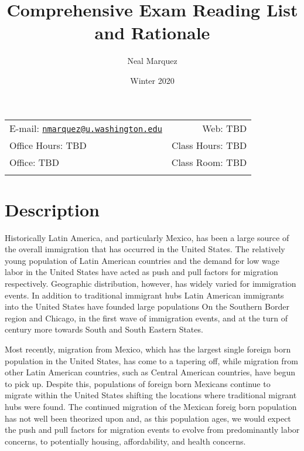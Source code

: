 \documentclass[11pt,]{article}
\title{Comprehensive Exam Reading List and Rationale}
\author{Neal Marquez}
\date{Winter 2020}
\begin{document}
  

		\maketitle
		
	
		\thispagestyle{firststyle}



	\noindent \begin{tabular*}{\textwidth}{ @{\extracolsep{\fill}} lr @{\extracolsep{\fill}}}


E-mail: \texttt{\href{mailto:nmarquez@u.washington.edu}{\nolinkurl{nmarquez@u.washington.edu}}} & Web: TBD\\
Office Hours: TBD  &  Class Hours: TBD\\
Office: TBD  & Class Room: TBD\\
	&  \\
	\hline
	\end{tabular*}
	
\vspace{2mm}
	


\hypertarget{description}{%
\section{Description}\label{description}}

Historically Latin America, and particularly Mexico, has been a large
source of the overall immigration that has occurred in the United
States. The relatively young population of Latin American countries and
the demand for low wage labor in the United States have acted as push
and pull factors for migration respectively. Geographic distribution,
however, has widely varied for immigration events. In addition to
traditional immigrant hubs Latin American immigrants into the United
States have founded large populations On the Southern Border region and
Chicago, in the first wave of immigration events, and at the turn of
century more towards South and South Eastern States.

Most recently, migration from Mexico, which has the largest single
foreign born population in the United States, has come to a tapering
off, while migration from other Latin American countries, such as
Central American countries, have begun to pick up. Despite this,
populations of foreign born Mexicans continue to migrate within the
United States shifting the locations where traditional migrant hubs were
found. The continued migration of the Mexican foreig born population has
not well been theorized upon and, as this population ages, we would
expect the push and pull factors for migration events to evolve from
predominantly labor concerns, to potentially housing, affordability, and
health concerns.
\end{document}
